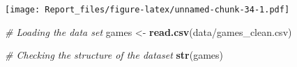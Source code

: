 \documentclass[
]{article}
\newenvironment{Shaded}{\begin{snugshade}}{\end{snugshade}}
\newcommand{\CommentTok}[1]{\textcolor[rgb]{0.56,0.35,0.01}{\textit{#1}}}
\newcommand{\FunctionTok}[1]{\textcolor[rgb]{0.13,0.29,0.53}{\textbf{#1}}}
\newcommand{\NormalTok}[1]{#1}
\newcommand{\OtherTok}[1]{\textcolor[rgb]{0.56,0.35,0.01}{#1}}
\newcommand{\StringTok}[1]{\textcolor[rgb]{0.31,0.60,0.02}{#1}}
\begin{document}
\texttt{[image: Report\_files/figure-latex/unnamed-chunk-34-1.pdf]}

\begin{Shaded}
\begin{Highlighting}[]
\CommentTok{\# Loading the data set}
\NormalTok{games }\OtherTok{\textless{}{-}} \FunctionTok{read.csv}\NormalTok{(}\StringTok{\textquotesingle{}data/games\_clean.csv\textquotesingle{}}\NormalTok{)}
\end{Highlighting}
\end{Shaded}

\begin{Shaded}
\begin{Highlighting}[]
\CommentTok{\# Checking the structure of the dataset}
\FunctionTok{str}\NormalTok{(games)}
\end{Highlighting}
\end{Shaded}
\end{document}

